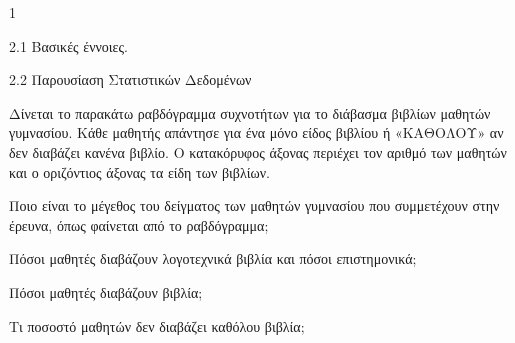 \begin{ylh}{1}
    \item 2.1 Βασικές έννοιες.
    \item 2.2 Παρουσίαση Στατιστικών Δεδομένων
\end{ylh}
Δίνεται το παρακάτω ραβδόγραμμα συχνοτήτων για το διάβασμα βιβλίων μαθητών γυμνασίου. Κάθε μαθητής απάντησε για ένα μόνο είδος βιβλίου ή «ΚΑΘΟΛΟΥ» αν δεν διαβάζει κανένα βιβλίο. Ο κατακόρυφος άξονας περιέχει τον αριθμό των μαθητών και ο οριζόντιος άξονας τα είδη των βιβλίων.

\begin{center}
\end{center}

\begin{alist}
\item Ποιο είναι το μέγεθος του δείγματος των μαθητών γυμνασίου που συμμετέχουν στην έρευνα, όπως φαίνεται από το ραβδόγραμμα; 

\item Πόσοι μαθητές διαβάζουν λογοτεχνικά βιβλία και πόσοι επιστημονικά; 

\item
\begin{rlist}
\item Πόσοι μαθητές διαβάζουν βιβλία; 
\item Τι ποσοστό μαθητών δεν διαβάζει καθόλου βιβλία; 
\end{rlist}
\end{alist}

